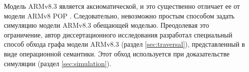 Модель ARMv8.3 является аксиоматической, и это
существенно отличает ее от модели ARMv8 POP \cite{Flur-al:POPL16}.
Следовательно, невозможно простым способом задать симуляцию модели ARMv8.3 обещающей моделью.
Преодолевая это ограничение, автор диссертационного исследования  разработал специальный способ обхода графа модели ARMv8.3
(раздел \ref{sec:traversal}),
представленный в виде операционной семантики.
Этот обход используется при доказательстве симуляции 
(раздел \ref{sec:simulation}).
